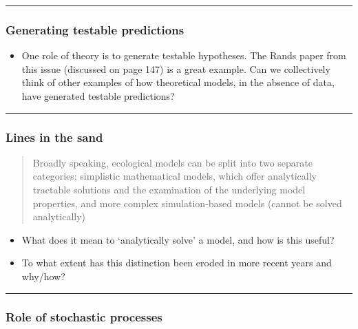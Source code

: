 \documentclass[
]{article}
\providecommand{\tightlist}{%
  \setlength{\itemsep}{0pt}\setlength{\parskip}{0pt}}
\begin{document}
\begin{center}\rule{0.5\linewidth}{0.5pt}\end{center}

\hypertarget{generating-testable-predictions}{%
\subsubsection{Generating testable
predictions}\label{generating-testable-predictions}}

\begin{itemize}
\tightlist
\item
  One role of theory is to generate testable hypotheses. The Rands paper
  from this issue (discussed on page 147) is a great example. Can we
  collectively think of other examples of how theoretical models, in the
  absence of data, have generated testable predictions?
\end{itemize}

\begin{center}\rule{0.5\linewidth}{0.5pt}\end{center}

\hypertarget{lines-in-the-sand}{%
\subsubsection{Lines in the sand}\label{lines-in-the-sand}}

\begin{quote}
Broadly speaking, ecological models can be split into two separate
categories; simplistic mathematical models, which offer analytically
tractable solutions and the examination of the underlying model
properties, and more complex simulation-based models (cannot be solved
analytically)
\end{quote}

\begin{itemize}
\tightlist
\item
  What does it mean to `analytically solve' a model, and how is this
  useful?
\item
  To what extent has this distinction been eroded in more recent years
  and why/how?
\end{itemize}

\begin{center}\rule{0.5\linewidth}{0.5pt}\end{center}

\hypertarget{role-of-stochastic-processes}{%
\subsubsection{Role of stochastic
processes}\label{role-of-stochastic-processes}}
\end{document}

